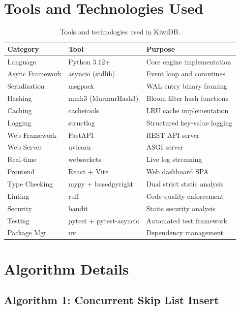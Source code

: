 \documentclass[oneside,a4paper,12pt]{book}
\begin{document}
\section{Tools and Technologies Used}

\begin{table}[!htbp]
\centering
\caption{Tools and technologies used in KiwiDB.}
\renewcommand{\arraystretch}{1.2}
\begin{tabular}{|l|l|l|}
\hline
\textbf{Category} & \textbf{Tool} & \textbf{Purpose} \\
\hline
Language & Python 3.12+ & Core engine implementation \\
\hline
Async Framework & asyncio (stdlib) & Event loop and coroutines \\
\hline
Serialization & msgpack & WAL entry binary framing \\
\hline
Hashing & mmh3 (MurmurHash3) & Bloom filter hash functions \\
\hline
Caching & cachetools & LRU cache implementation \\
\hline
Logging & structlog & Structured key-value logging \\
\hline
Web Framework & FastAPI & REST API server \\
\hline
Web Server & uvicorn & ASGI server \\
\hline
Real-time & websockets & Live log streaming \\
\hline
Frontend & React + Vite & Web dashboard SPA \\
\hline
Type Checking & mypy + basedpyright & Dual strict static analysis \\
\hline
Linting & ruff & Code quality enforcement \\
\hline
Security & bandit & Static security analysis \\
\hline
Testing & pytest + pytest-asyncio & Automated test framework \\
\hline
Package Mgr & uv & Dependency management \\
\hline
\end{tabular}
\end{table}

\section{Algorithm Details}

\subsection{Algorithm 1: Concurrent Skip List Insert}
\end{document}
